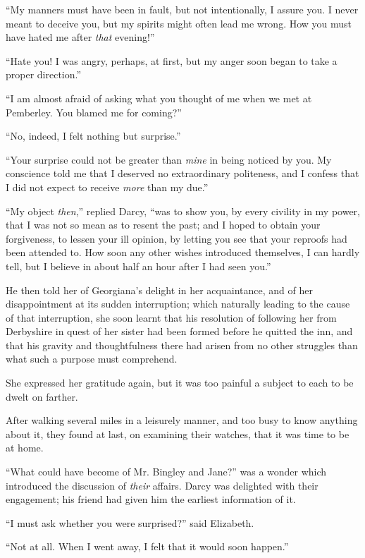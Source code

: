 \documentclass[12pt]{book}
\begin{document}
``My manners must have been in fault, but not intentionally, I assure you. I never meant to deceive you, but my spirits might often lead me wrong. How you must have hated me after \textit{that} evening!''

``Hate you! I was angry, perhaps, at first, but my anger soon began to take a proper direction.''

``I am almost afraid of asking what you thought of me when we met at Pemberley. You blamed me for coming?''

``No, indeed, I felt nothing but surprise.''

``Your surprise could not be greater than \textit{mine} in being noticed by you. My conscience told me that I deserved no extraordinary politeness, and I confess that I did not expect to receive \textit{more} than my due.''

``My object \textit{then},'' replied Darcy, ``was to show you, by every civility in my power, that I was not so mean as to resent the past; and I hoped to obtain your forgiveness, to lessen your ill opinion, by letting you see that your reproofs had been attended to. How soon any other wishes introduced themselves, I can hardly tell, but I believe in about half an hour after I had seen you.''

He then told her of Georgiana's delight in her acquaintance, and of her disappointment at its sudden interruption; which naturally leading to the cause of that interruption, she soon learnt that his resolution of following her from Derbyshire in quest of her sister had been formed before he quitted the inn, and that his gravity and thoughtfulness there had arisen from no other struggles than what such a purpose must comprehend.

She expressed her gratitude again, but it was too painful a subject to each to be dwelt on farther.

After walking several miles in a leisurely manner, and too busy to know anything about it, they found at last, on examining their watches, that it was time to be at home.

``What could have become of Mr. Bingley and Jane?'' was a wonder which introduced the discussion of \textit{their} affairs. Darcy was delighted with their engagement; his friend had given him the earliest information of it.

``I must ask whether you were surprised?'' said Elizabeth.

``Not at all. When I went away, I felt that it would soon happen.''
\end{document}
